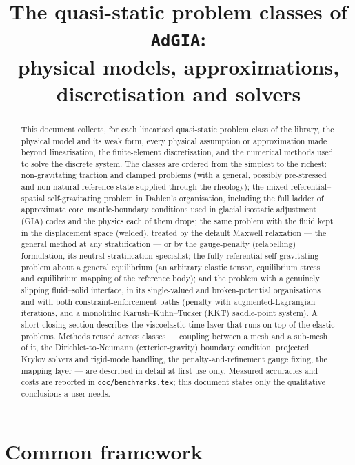 \documentclass[11pt]{article}
\title{The quasi-static problem classes of \texttt{AdGIA}:\\
       physical models, approximations, discretisation and solvers}
\author{}
\date{}
\numberwithin{equation}{section}
\theoremstyle{remark}
\newcommand{\code}[1]{\texttt{#1}}
\begin{document}
\maketitle

\begin{abstract}
\noindent
This document collects, for each linearised quasi-static problem class of
the library, the physical model and its weak form, every physical
assumption or approximation made beyond linearisation, the finite-element
discretisation, and the numerical methods used to solve the discrete
system. The classes are ordered from the simplest to the richest:
non-gravitating traction and clamped problems (with a general, possibly
pre-stressed and non-natural reference state supplied through the
rheology); the mixed referential--spatial self-gravitating problem in
Dahlen's organisation, including the full ladder of approximate
core--mantle-boundary conditions used in glacial isostatic adjustment
(GIA) codes and the physics each of them drops; the same problem with the
fluid kept in the displacement space (welded), treated by the default
Maxwell relaxation --- the general method at any stratification --- or by
the gauge-penalty (relabelling) formulation, its neutral-stratification
specialist; the fully
referential self-gravitating problem about a general equilibrium
(an arbitrary elastic tensor, equilibrium stress and equilibrium mapping
of the reference body); and the problem with a genuinely slipping
fluid--solid interface, in its single-valued and broken-potential
organisations and with both constraint-enforcement paths
(penalty with augmented-Lagrangian iterations, and a monolithic
Karush--Kuhn--Tucker (KKT) saddle-point system). A short closing section describes the viscoelastic time layer
that runs on top of the elastic problems. Methods reused across classes
--- coupling between a mesh and a sub-mesh of it, the
Dirichlet-to-Neumann (exterior-gravity) boundary condition, projected
Krylov solvers and rigid-mode handling, the penalty-and-refinement gauge
fixing, the mapping layer --- are described in detail at first use only.
Measured accuracies and costs are reported in \code{doc/benchmarks.tex};
this document states only the qualitative conclusions a user needs.
\end{abstract}

\tableofcontents

\section{Common framework}
\label{sec:common}
\end{document}
